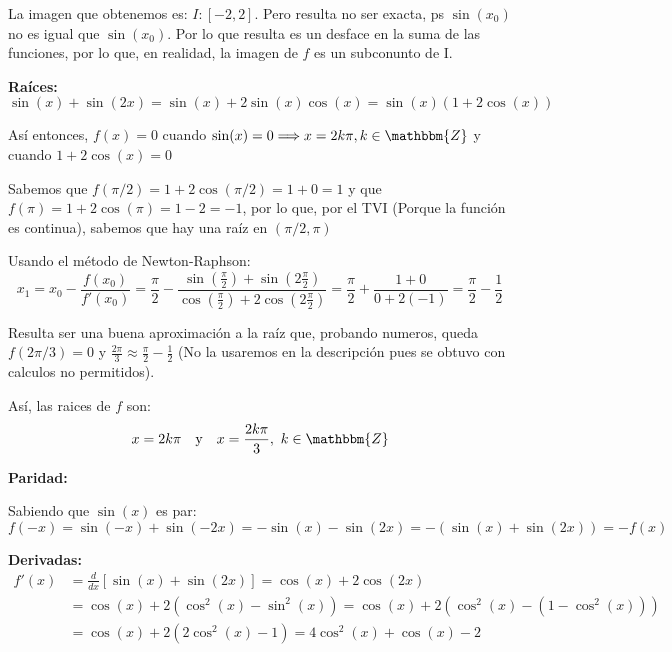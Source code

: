 \documentclass[12pt]{article}
\begin{document}
\begin{enumerate}[\hspace{9px} a)]
        La imagen que obtenemos es: \(I:[-2,2]\). Pero resulta no ser exacta, ps \(\sin(x_0)\) no es igual que \(\sin(x_0)\). Por lo que resulta es un desface en la suma de las funciones, por lo que, en realidad, la imagen de $f$ es un subconunto de I.\medskip

    \textbf{Ra\'ices: }
        \begin{equation*}
            \sin(x)+\sin(2x) = \sin(x)+2\sin(x)\cos(x) = \sin(x)(1+2\cos(x))
        \end{equation*}

        As\'i entonces, \(f(x)=0\) cuando \(\sin(x)=0 \Longrightarrow x=2k\pi, k\in\mathbbm{Z}\) y cuando \(1+2\cos(x)=0\)\medskip

        Sabemos que \(f(\pi/2)=1+2\cos(\pi/2)=1+0=1\) y que \(f(\pi) = 1+2\cos(\pi) = 1-2 = -1\), por lo que, por el TVI (Porque la funci\'on es continua), sabemos que hay una ra\'iz en \((\pi/2,\pi)\)\medskip

        Usando el m\'etodo de Newton-Raphson:
        \begin{equation*}
            x_1 = x_0 - \frac{f(x_0)}{f'(x_0)} = \frac{\pi}{2} - \frac{\sin(\frac{\pi}{2})+\sin(2\frac{\pi}{2})}{\cos(\frac{\pi}{2})+2\cos(2\frac{\pi}{2})} = \frac{\pi}{2}+\frac{1+0}{0+2(-1)} = \frac{\pi}{2}-\frac{1}{2}
        \end{equation*}

        Resulta ser una buena aproximaci\'on a la ra\'iz que, probando numeros, queda \(f(2\pi/3) = 0\) y \(\displaystyle\frac{2\pi}{3}\approx\frac{\pi}{2}-\frac{1}{2}\) (No la usaremos en la descripci\'on pues se obtuvo con calculos no permitidos).\medskip

        As\'i, las raices de \(f\) son:
        \begin{align*}
            x = 2k\pi \quad \text{y} \quad x = \frac{2k\pi}{3}, \ k\in \mathbbm{Z}
        \end{align*}

    \textbf{Paridad: }\medskip
        
        Sabiendo que \(\sin(x)\) es par:
        \begin{equation*}
            f(-x)=\sin(-x)+\sin(-2x) = -\sin(x) - \sin(2x) = -(\sin(x)+\sin(2x)) = -f(x)
        \end{equation*}

    \textbf{Derivadas: }
        \begin{align*}
            f'(x) &= \frac{d}{dx}[\sin(x)+\sin(2x)] = \cos(x) + 2\cos(2x) \\
            &= \cos(x) + 2(\cos^2(x)-\sin^2(x)) = \cos(x) + 2(\cos^2(x)-(1-\cos^2(x))) \\
            &= \cos(x) + 2(2\cos^2(x)-1) = 4\cos^2(x)+\cos(x)-2
        \end{align*}


\end{enumerate}
\end{document}
